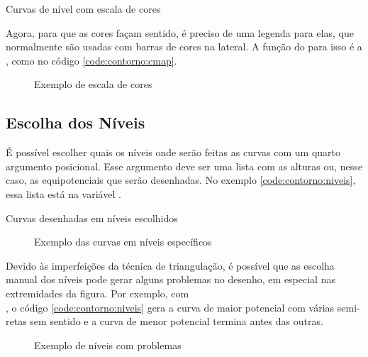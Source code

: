     \begin{listing}[H]
        \caption{Curvas de nível com escala de cores}
        \label{code:contorno:cmap}

    \end{listing}

    Agora, para que as cores façam sentido, é preciso de uma legenda para elas, que normalmente são usadas com barras de cores na lateral. A função do \pyplot para isso é a , como no código \ref{code:contorno:cmap}.

    \begin{figure}[H]
        \centering
        

        \caption{Exemplo de escala de cores}
        \label{fig:contorno:cmap}
    \end{figure}


\subsection{Escolha dos Níveis}

    É possível escolher quais os níveis onde serão feitas as curvas com um quarto argumento posicional. Esse argumento deve ser uma lista com as alturas ou, nesse caso, as equipotenciais que serão desenhadas. No exemplo \ref{code:contorno:niveis}, essa lista está na variável .

    \begin{listing}[H]
        \caption{Curvas desenhadas em níveis escolhidos}
        \label{code:contorno:niveis}

    \end{listing}

    \begin{figure}[H]
        \centering
        

        \caption{Exemplo das curvas em níveis específicos}
        \label{fig:contorno:niveis}
    \end{figure}

    \begin{nota}
        Devido às imperfeições da técnica de triangulação, é possível que as escolha manual dos níveis pode gerar alguns problemas no desenho, em especial nas extremidades da figura. Por exemplo, com \\, o código \ref{code:contorno:niveis} gera a curva de maior potencial com várias semi-retas sem sentido e a curva de menor potencial termina antes das outras.

        \begin{figure}[H]
            \centering
            

            \caption{Exemplo de níveis com problemas}
            \label{fig:contorno:niveis:problema}
        \end{figure}
    \end{nota}


